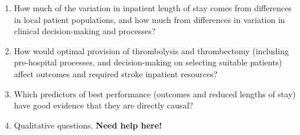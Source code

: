 \begin{enumerate}
    \item How much of the variation in inpatient length of stay comes from differences in local patient populations, and how much from differences in variation in clinical decision-making and processes?
    \item How would optimal provision of thrombolysis and thrombectomy (including pre-hospital processes, and decision-making on selecting suitable patients) affect outcomes and required stroke inpatient resources?
    \item Which predictors of best performance (outcomes and reduced lengths of stay) have good evidence that they are directly causal?
    \item Qualitative questions. \textbf{Need help here!} 
\end{enumerate}

